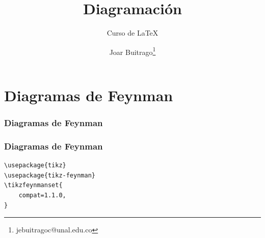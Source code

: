 \documentclass[12pt,aspectratio=169,ignorenonframetext]{ltxbeamer}
\title{Diagramación}
\subtitle{Curso de {\lmr\LaTeX}}
\author{Joar Buitrago\texorpdfstring{\thanks{jebuitragoc@unal.edu.co}}{ <jebuitragoc@unal.edu.co>}}
\date{}
\begin{document}
\begin{frame}
\maketitle
\end{frame}





\section{Diagramas de Feynman}

\begin{frame}
\frametitle{Diagramas de Feynman}

\begin{center}
\end{center}
\end{frame}





\begin{frame}[fragile]
\frametitle{Diagramas de Feynman}

\begin{verbatim}
\usepackage{tikz}
\usepackage{tikz-feynman}
\tikzfeynmanset{
    compat=1.1.0,
}
\end{verbatim}
\end{frame}
\end{document}
